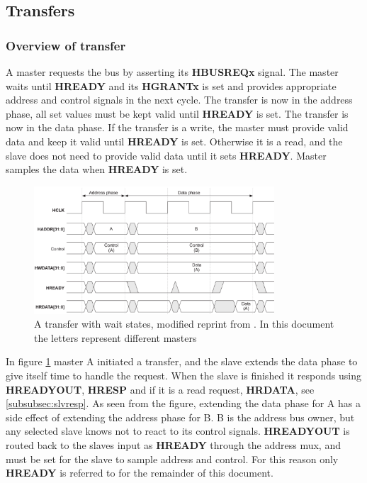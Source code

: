 \subsection{Transfers}

\subsubsection{Overview of transfer}
A master requests the bus by asserting its \textbf{HBUSREQx} signal. The master waits until \textbf{HREADY} and its \textbf{HGRANTx} is set and provides appropriate address and control signals in the next cycle. The transfer is now in the address phase, all set values must be kept valid until \textbf{HREADY} is set. The transfer is now in the data phase. If the transfer is a write, the master must provide valid data and keep it valid until \textbf{HREADY} is set. Otherwise it is a read, and the slave does not need to provide valid data until it sets \textbf{HREADY}. Master samples the data when \textbf{HREADY} is set.
\newpage

\begin{figure}[hbt]
    \begin{center}
        \includegraphics[width=0.8\textwidth]{figs/AHB/transfer.png}
    \end{center}
    \caption{A transfer with wait states, modified reprint from \cite{amba}. In this document the letters represent different masters}
    \label{fig:transfer}
\end{figure}

In figure \ref{fig:transfer} master A initiated a transfer, and the slave extends the data phase to give itself time to handle the request. When the slave is finished it responds using \textbf{HREADYOUT}, \textbf{HRESP} and if it is a read request, \textbf{HRDATA}, see \ref{subsubsec:slvresp}. As seen from the figure, extending the data phase for A has a side effect of extending the address phase for B. B is the address bus owner, but any selected slave knows not to react to its control signals. \textbf{HREADYOUT} is routed back to the slaves input as \textbf{HREADY} through the address mux, and must be set for the slave to sample address and control. For this reason only \textbf{HREADY} is referred to for the remainder of this document. 

